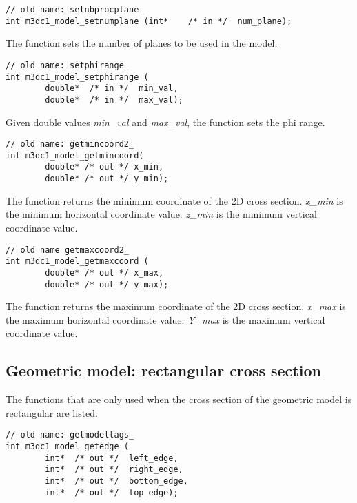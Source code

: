 \begin{verbatim}
// old name: setnbprocplane_
int m3dc1_model_setnumplane (int*    /* in */  num_plane);
\end{verbatim}\vspace{-.5cm}\hspace{1cm}

The function sets the number of planes to be used in the model.


\begin{verbatim}
// old name: setphirange_
int m3dc1_model_setphirange (
        double*  /* in */  min_val, 
        double*  /* in */  max_val);
\end{verbatim}\vspace{-.5cm}\hspace{1cm}

Given double values \emph{min\_val} and \emph{max\_val}, the function sets the phi range.

\begin{verbatim}
// old name: getmincoord2_
int m3dc1_model_getmincoord(
        double* /* out */ x_min, 
        double* /* out */ y_min);
\end{verbatim}\vspace{-.5cm}\hspace{1cm}

The function returns the minimum coordinate of the 2D cross section.
	      \textit{x\_min} is the minimum horizontal coordinate value. 
	      \textit{z\_min} is the minimum vertical coordinate value.
\begin{verbatim}
// old name getmaxcoord2_
int m3dc1_model_getmaxcoord (
        double* /* out */ x_max, 
        double* /* out */ y_max);
\end{verbatim}\vspace{-.5cm}\hspace{1cm}
        
The function returns the maximum coordinate of the 2D  cross section. 
          \textit{x\_max} is the maximum horizontal coordinate value. 
          \textit{Y\_max} is the maximum vertical coordinate value.

\subsection{Geometric model: rectangular cross section}
The functions that are only used when the cross section of the geometric model is rectangular are listed.

\begin{verbatim}
// old name: getmodeltags_
int m3dc1_model_getedge (
        int*  /* out */  left_edge,
        int*  /* out */  right_edge, 
        int*  /* out */  bottom_edge, 
        int*  /* out */  top_edge);

\end{verbatim}\vspace{-.5cm}\hspace{1cm}

